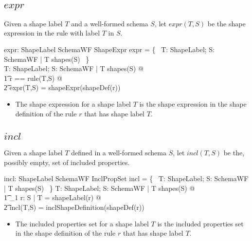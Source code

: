 \documentclass{article}
\begin{document}
\subsection{$expr$}
Given a shape label $T$ and a well-formed schema $S$, let $expr(T,S)$ be the shape expression in the rule with label $T$ in $S$.
\begin{axdef}
	expr: ShapeLabel \cross SchemaWF \pfun ShapeExpr
\where
	\dom expr = \{~ T: ShapeLabel; S: SchemaWF | T \in shapes(S) ~\} \\
\also
	\forall T: ShapeLabel; S: SchemaWF | T \in shapes(S) @ \\
\t1		\LET r == rule(T,S) @ \\
\t2			expr(T,S) = shapeExpr(shapeDef(r))
\end{axdef}
\begin{itemize}
\item The shape expression for a shape label $T$ is the shape expression in the shape definition of the rule $r$ that has shape label $T$.
\end{itemize}

\subsection{$incl$}

Given a shape label $T$ defined in a well-formed schema $S$, let $incl(T,S)$ be the,
possibly empty, set of included properties.
\begin{axdef}
	incl: ShapeLabel \cross SchemaWF \pfun InclPropSet
\where
	\dom incl = \{~ T: ShapeLabel; S: SchemaWF | T \in shapes(S) ~\}
\also
	\forall T: ShapeLabel; S: SchemaWF | T \in shapes(S) @ \\
\t1		\exists_1 r: \ran S | T = shapeLabel(r) @ \\
\t2			incl(T,S) = inclShapeDefinition(shapeDef(r))
\end{axdef}
\begin{itemize}
\item The included properties set for a shape label $T$ is the included properties set in the shape definition of the rule $r$ that has shape label $T$.
\end{itemize}
\end{document}
